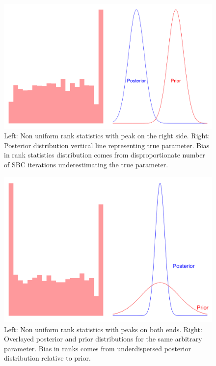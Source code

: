 \documentclass[12pt, a4paper]{article}
\begin{document}
            \begin{figure}[H]
                \centering
                \includegraphics[scale=0.07]{methodology/rhs.png}
                \caption{Left: Non uniform rank statistics with peak on the right side. Right: Posterior distribution vertical line representing true parameter. Bias in rank statistics distribution comes from disproportionate number of SBC iterations underestimating the true parameter.}
                \label{fig:underestimation}
            \end{figure}        

            \begin{figure}[H]
                \centering
                \includegraphics[scale=0.07]{methodology/underdispersed.png}
                \caption{Left: Non uniform rank statistics with peaks on both ends. Right: Overlayed posterior and prior distributions for the same arbitrary parameter. Bias in ranks comes from underdispersed posterior distribution relative to prior.}
                \label{fig:underdispersed}
            \end{figure}
\end{document}
